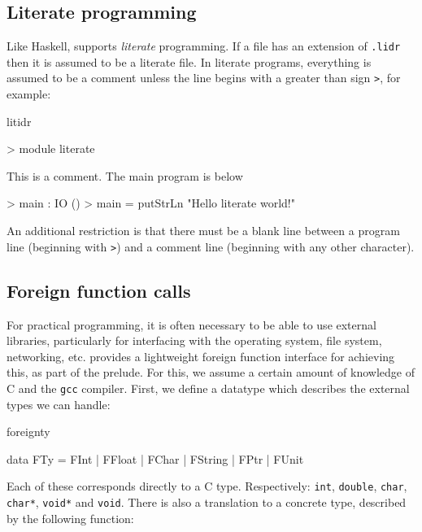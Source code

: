 \subsection{Literate programming}

Like Haskell, \Idris{} supports \emph{literate} programming. If a file has an
extension of \texttt{.lidr} then it is assumed to be a literate file. In literate
programs, everything is assumed to be a comment unless the line begins with a
greater than sign \texttt{>}, for example:

\begin{SaveVerbatim}{litidr}

> module literate

This is a comment. The main program is below

> main : IO ()
> main = putStrLn "Hello literate world!\n"

\end{SaveVerbatim}

\noindent
An additional restriction is that there must be a blank line between a program
line (beginning with \texttt{>}) and a comment line (beginning with any other
character).

\subsection{Foreign function calls}

For practical programming, it is often necessary to be able to use external libraries,
particularly for interfacing with the operating system, file system, networking, etc.
\Idris{} provides a lightweight foreign function interface for achieving this,
as part of the prelude. For this, we assume a certain amount of knowledge of
C and the \texttt{gcc} compiler. First, we define a datatype which describes the external
types we can handle:

\begin{SaveVerbatim}{foreignty}

data FTy = FInt | FFloat | FChar | FString | FPtr | FUnit

\end{SaveVerbatim}

\noindent
Each of these corresponds directly to a C type. Respectively: \texttt{int},
\texttt{double}, \texttt{char}, \texttt{char*}, \texttt{void*} and \texttt{void}.
There is also a translation to a concrete \Idris{} type, described by the
following function:

